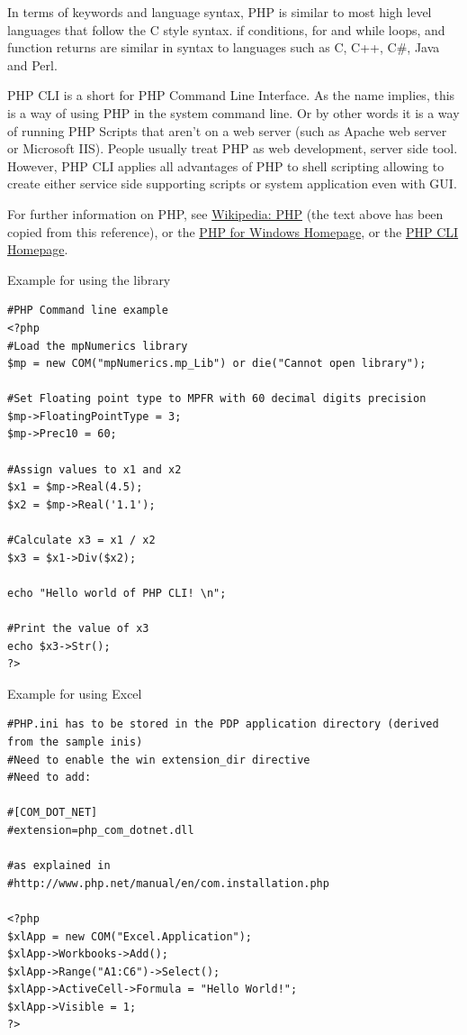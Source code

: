 \vpara
In terms of keywords and language syntax, PHP is similar to most high level languages that follow the C style syntax. if conditions, for and while loops, and function returns are similar in syntax to languages such as C, C++, C\#, Java and Perl.

\vpara
PHP CLI is a short for PHP Command Line Interface. As the name implies, this is a way of using PHP in the system command line. Or by other words it is a way of running PHP Scripts that aren't on a web server (such as Apache web server or Microsoft IIS). People usually treat PHP as web development, server side tool. However, PHP CLI applies all advantages of PHP to shell scripting allowing to create either service side supporting scripts or system application even with GUI.

\vpara
For further information on PHP, see \href{http://en.wikipedia.org/wiki/PHP}{Wikipedia: PHP} (the text above has been copied from this reference), or the  \href{http://windows.php.net/}{PHP for Windows Homepage}, or the  \href{http://www.php-cli.com/}{PHP CLI Homepage}.

\vpara
Example for using the library

\begin{lstlisting}
#PHP Command line example
<?php
#Load the mpNumerics library
$mp = new COM("mpNumerics.mp_Lib") or die("Cannot open library");

#Set Floating point type to MPFR with 60 decimal digits precision
$mp->FloatingPointType = 3;
$mp->Prec10 = 60;

#Assign values to x1 and x2
$x1 = $mp->Real(4.5);
$x2 = $mp->Real('1.1');

#Calculate x3 = x1 / x2
$x3 = $x1->Div($x2);

echo "Hello world of PHP CLI! \n";

#Print the value of x3
echo $x3->Str();
?>
\end{lstlisting}


\vpara
Example for using Excel

\begin{lstlisting}
#PHP.ini has to be stored in the PDP application directory (derived from the sample inis)
#Need to enable the win extension_dir directive
#Need to add:

#[COM_DOT_NET]
#extension=php_com_dotnet.dll

#as explained in 
#http://www.php.net/manual/en/com.installation.php

<?php
$xlApp = new COM("Excel.Application");
$xlApp->Workbooks->Add();
$xlApp->Range("A1:C6")->Select();
$xlApp->ActiveCell->Formula = "Hello World!";
$xlApp->Visible = 1;
?>
\end{lstlisting}




